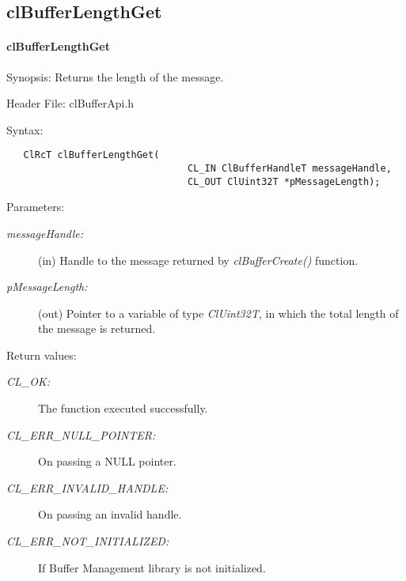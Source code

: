 \subsection{clBufferLengthGet}
\hypertarget{pagebuf107}{}\paragraph{cl\-Buffer\-Length\-Get}\label{pagebuf107}
\begin{Desc}
\item[Synopsis:]Returns the length of the message.\end{Desc}
\begin{Desc}
\item[Header File:]clBufferApi.h\end{Desc}
\begin{Desc}
\item[Syntax:]

\footnotesize\begin{verbatim}   ClRcT clBufferLengthGet(
                                CL_IN ClBufferHandleT messageHandle,
                                CL_OUT ClUint32T *pMessageLength);
\end{verbatim}
\normalsize
\end{Desc}
\begin{Desc}
\item[Parameters:]
\begin{description}
\item[{\em message\-Handle:}](in) Handle to the message returned by \textit{clBufferCreate()} function. \item[{\em p\-Message\-Length:}](out) Pointer to a variable of type {\em Cl\-Uint32T\/}, in which the total length of the message is returned.\end{description}
\end{Desc}
\begin{Desc}
\item[Return values:]
\begin{description}
\item[{\em CL\_\-OK:}]The function executed successfully. \item[{\em CL\_\-ERR\_\-NULL\_\-POINTER:}]On passing a NULL pointer. \item[{\em CL\_\-ERR\_\-INVALID\_\-HANDLE:}]On passing an invalid handle. \item[{\em CL\_\-ERR\_\-NOT\_\-INITIALIZED:}]If Buffer Management library is not initialized.\end{description}
\end{Desc}
